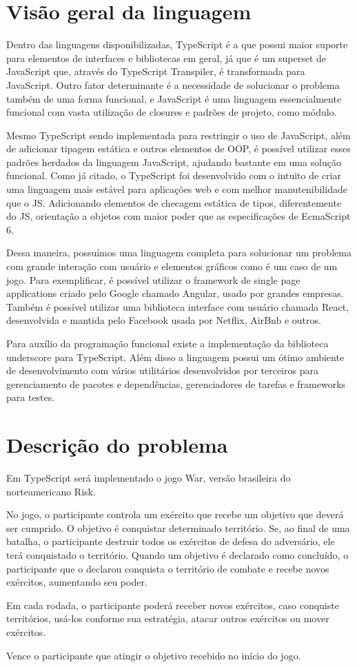 \documentclass[rel_mlp]{iiufrgs}
\begin{document}
\section{Visão geral da linguagem}
Dentro das linguagens disponibilizadas, TypeScript é a que possui maior suporte para elementos de interfaces e bibliotecas em geral, já que é um superset de JavaScript que, através do TypeScript Transpiler, é  transformada para JavaScript.
Outro fator determinante é a necessidade de solucionar o problema também de uma forma funcional, e JavaScript é uma linguagem essencialmente funcional com vasta utilização de closures e padrões de projeto, como módulo. \par
Mesmo TypeScript sendo implementada para restringir o uso de JavaScript, além de adicionar tipagem estática e outros elementos de OOP, é possível utilizar esses padrões herdados da linguagem JavaScript, ajudando bastante em uma solução funcional.
Como já citado, o TypeScript foi desenvolvido com o intuito de criar uma linguagem mais estável para aplicações web e com melhor manutenibilidade que o JS. Adicionando elementos de checagem estática de tipos, diferentemente do JS, orientação a objetos com maior poder que as especificações de EcmaScript 6. \par
Dessa maneira, possuímos uma linguagem completa para solucionar um problema com grande interação com usuário e elementos gráficos como é um caso de um jogo.
Para exemplificar, é possível utilizar o framework de single page applications criado pelo Google chamado Angular, usado por grandes empresas. Também é possível utilizar uma biblioteca interface com usuário chamada React, desenvolvida e mantida pelo Facebook usada por Netflix, AirBnb e outros. \par
Para auxílio da programação funcional existe a implementação da biblioteca underscore para TypeScript.
Além disso a linguagem possui um ótimo ambiente de desenvolvimento com vários utilitários desenvolvidos por terceiros para gerenciamento de pacotes e dependências, gerenciadores de tarefas e frameworks para testes.


\section{Descrição do problema}
Em TypeScript será implementado o jogo War, versão brasileira do norteamericano Risk. \par
No jogo, o participante controla um exército que recebe um objetivo que deverá ser cumprido.
O objetivo é conquistar determinado território. Se, ao final de uma batalha, o participante destruir todos os exércitos de defesa do adversário, ele terá conquistado o território.
Quando um objetivo é declarado como concluído, o participante que o declarou conquista o território de combate e recebe novos exércitos, aumentando seu poder. \par
Em cada rodada, o participante poderá receber novos exércitos, caso conquiste territórios, usá-los conforme sua estratégia, atacar outros exércitos ou mover exércitos. \par
Vence o participante que atingir o objetivo recebido no início do jogo.
\end{document}
